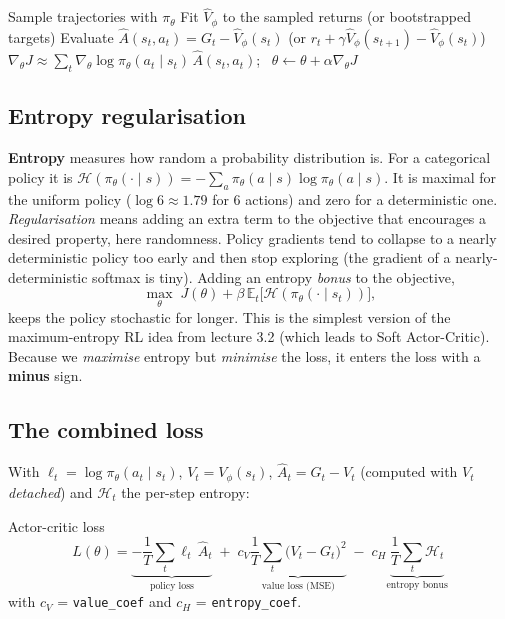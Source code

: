 \documentclass[11pt,a4paper]{article}
\newcommand{\E}{\mathbb{E}}
\newcommand{\pit}{\pi_\theta}
\newcommand{\gradt}{\nabla_\theta}
\newcommand{\hA}{\hat{A}}
\newcommand{\Hent}{\mathcal{H}}
\newcommand{\code}[1]{\texttt{#1}}
\begin{document}
\begin{algorithm}[H]
\caption{Batch advantage actor-critic (A2C), lecture 3.2}
\begin{algorithmic}[1]
\Loop
  \State Sample trajectories with $\pit$
  \State Fit $\hat V_\phi$ to the sampled returns (or bootstrapped targets)
  \State Evaluate $\hA(s_t,a_t) = G_t - \hat V_\phi(s_t)$ \quad (or $r_t+\gamma\hat V_\phi(s_{t+1})-\hat V_\phi(s_t)$)
  \State $\gradt J \approx \sum_t\gradt\log\pit(a_t\mid s_t)\,\hA(s_t,a_t)$; \ $\theta\gets\theta+\alpha\gradt J$
\EndLoop
\end{algorithmic}
\end{algorithm}

\subsection{Entropy regularisation}\label{sec:entropy}
\textbf{Entropy} measures how random a probability distribution is. For a categorical policy it is $\Hent(\pit(\cdot\mid s)) = -\sum_a\pit(a\mid s)\log\pit(a\mid s)$. It is maximal for the uniform policy ($\log 6\approx1.79$ for 6 actions) and zero for a deterministic one. \emph{Regularisation} means adding an extra term to the objective that encourages a desired property, here randomness.
Policy gradients tend to collapse to a nearly deterministic policy too early and then stop exploring (the gradient of a nearly-deterministic softmax is tiny).
Adding an entropy \emph{bonus} to the objective,
\[
  \max_\theta\; J(\theta) + \beta\,\E_t\big[\Hent(\pit(\cdot\mid s_t))\big],
\]
keeps the policy stochastic for longer. This is the simplest version of the maximum-entropy RL idea from lecture 3.2 (which leads to Soft Actor-Critic). Because we \emph{maximise} entropy but \emph{minimise} the loss, it enters the loss with a \textbf{minus} sign.

\subsection{The combined loss}
With $\ell_t = \log\pit(a_t\mid s_t)$, $V_t = V_\phi(s_t)$, $\hA_t = G_t - V_t$ (computed with $V_t$ \emph{detached}) and $\Hent_t$ the per-step entropy:
\begin{keybox}{Actor-critic loss}
\vspace{-0.6em}
\begin{equation}
  L(\theta) =
  \underbrace{-\frac1T\sum_t \ell_t\,\hA_t}_{\text{policy loss}}
  \;+\; c_V\underbrace{\frac1T\sum_t\big(V_t - G_t\big)^2}_{\text{value loss (MSE)}}
  \;-\; c_H\underbrace{\frac1T\sum_t\Hent_t}_{\text{entropy bonus}}
  \label{eq:ac-loss}
\end{equation}
with $c_V$ = \code{value\_coef} and $c_H$ = \code{entropy\_coef}.
\end{keybox}
\end{document}
